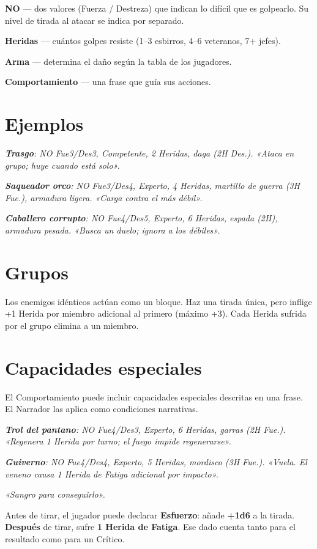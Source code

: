\documentclass[10pt,a4paper]{article}
\begin{document}
\textbf{NO} — dos valores (Fuerza / Destreza) que indican lo difícil que es golpearlo. Su nivel de tirada al atacar se indica por separado.

\textbf{Heridas} — cuántos golpes resiste (1–3 esbirros, 4–6 veteranos, 7+ jefes).

\textbf{Arma} — determina el daño según la tabla de los jugadores.

\textbf{Comportamiento} — una frase que guía sus acciones.

\section*{Ejemplos}
\textbf{\textit{Trasgo}}\textit{: NO Fue3/Des3, Competente, 2 Heridas, daga (2H Des.). «Ataca en grupo; huye cuando está solo».}

\textbf{\textit{Saqueador orco}}\textit{: NO Fue3/Des4, Experto, 4 Heridas, martillo de guerra (3H Fue.), armadura ligera. «Carga contra el más débil».}

\textbf{\textit{Caballero corrupto}}\textit{: NO Fue4/Des5, Experto, 6 Heridas, espada (2H), armadura pesada. «Busca un duelo; ignora a los débiles».}

\section*{Grupos}
Los enemigos idénticos actúan como un bloque. Haz una tirada única, pero inflige +1 Herida por miembro adicional al primero (máximo +3). Cada Herida sufrida por el grupo elimina a un miembro.

\section*{Capacidades especiales}
El Comportamiento puede incluir capacidades especiales descritas en una frase. El Narrador las aplica como condiciones narrativas.

\textbf{\textit{Trol del pantano}}\textit{: NO Fue4/Des3, Experto, 6 Heridas, garras (2H Fue.). «Regenera 1 Herida por turno; el fuego impide regenerarse».}

\textbf{\textit{Guiverno}}\textit{: NO Fue4/Des4, Experto, 5 Heridas, mordisco (3H Fue.). «Vuela. El veneno causa 1 Herida de Fatiga adicional por impacto».}

\textit{«Sangro para conseguirlo».}

Antes de tirar, el jugador puede declarar \textbf{Esfuerzo}: añade \textbf{+1d6} a la tirada. \textbf{Después} de tirar, sufre \textbf{1 Herida de Fatiga}. Ese dado cuenta tanto para el resultado como para un Crítico.
\end{document}

